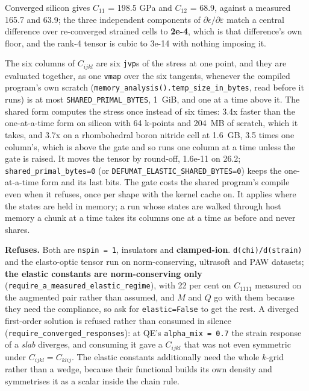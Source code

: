 \documentclass[11pt,a4paper]{article}
\newcommand{\code}[1]{\texttt{\small #1}}
\begin{document}
Converged silicon gives $C_{11}$ = 198.5 GPa and $C_{12}$ = 68.9, against a
measured 165.7 and 63.9; the three independent components of
$\partial\epsilon/\partial\varepsilon$ match a central difference over
re-converged strained cells to \textbf{2e-4}, which is that difference's own
floor, and the rank-4 tensor is cubic to 3e-14 with nothing imposing it.

\noindent The six columns of $C_{ijkl}$ are six \code{jvp}s of the stress at
one point, and they are evaluated together, as one \code{vmap} over the six
tangents, whenever the compiled program's own scratch
(\code{memory\_analysis().temp\_size\_in\_bytes}, read before it runs) is at
most \code{SHARED\_PRIMAL\_BYTES}, 1~GiB, and one at a time above it. The
shared form computes the stress once instead of six times: 3.4x faster than
the one-at-a-time form on silicon with 64 k-points and 204~MB of scratch, which
it takes, and 3.7x on a rhombohedral boron nitride cell at 1.6~GB, 3.5 times
one column's, which is
above the gate and so runs one column at a time unless the gate is raised. It
moves the tensor by round-off, 1.6e-11 on 26.2; \code{shared\_primal\_bytes=0} (or
\code{DEFUMAT\_ELASTIC\_SHARED\_BYTES=0}) keeps the one-at-a-time form and its
last bits. The gate costs the shared program's compile even when it refuses,
once per shape with the kernel cache on. It applies where the states are held
in memory; a run whose states are walked through host memory a chunk at a time
takes its columns one at a time as before and never shares.

\begin{refuses}
\textbf{Refuses.} Both are \code{nspin = 1}, insulators and
\textbf{clamped-ion}. \code{d(chi)/d(strain)} and the elasto-optic tensor run
on norm-conserving, ultrasoft and PAW datasets; \textbf{the elastic constants
are norm-conserving only} (\code{require\_a\_measured\_elastic\_regime}), with
22 per cent on $C_{1111}$ measured on the augmented pair rather than assumed,
and $M$ and $Q$ go with them because they need the compliance, so ask for
\code{elastic=False} to get the rest. A diverged first-order solution is
refused rather than consumed in silence
(\code{require\_converged\_responses}): at QE's \code{alpha\_mix = 0.7} the
strain response of a \emph{slab} diverges, and consuming it gave a $C_{ijkl}$
that was not even symmetric under $C_{ijkl} = C_{klij}$. The elastic constants
additionally need the whole $k$-grid rather than a wedge, because their
functional builds its own density and symmetrises it as a scalar inside the
chain rule.
\end{refuses}
\end{document}

